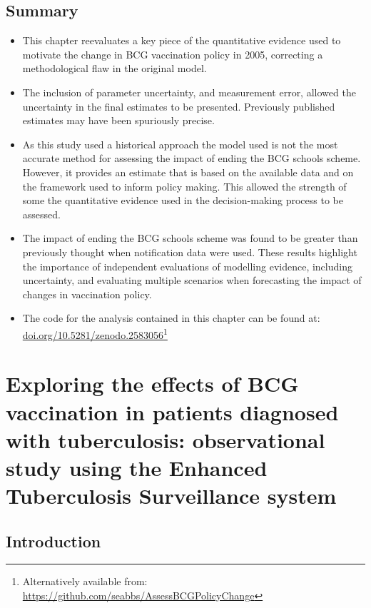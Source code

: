 \documentclass[11pt,twoside]{bristolthesis}
\begin{document}
  \hypertarget{summary-4}{%
  \section{Summary}\label{summary-4}}
  \begin{itemize}
  \item
    This chapter reevaluates a key piece of the quantitative evidence used to motivate the change in BCG vaccination policy in 2005, correcting a methodological flaw in the original model.
  \item
    The inclusion of parameter uncertainty, and measurement error, allowed the uncertainty in the final estimates to be presented. Previously published estimates may have been spuriously precise.
  \item
    As this study used a historical approach the model used is not the most accurate method for assessing the impact of ending the BCG schools scheme. However, it provides an estimate that is based on the available data and on the framework used to inform policy making. This allowed the strength of some the quantitative evidence used in the decision-making process to be assessed.
  \item
    The impact of ending the BCG schools scheme was found to be greater than previously thought when notification data were used. These results highlight the importance of independent evaluations of modelling evidence, including uncertainty, and evaluating multiple scenarios when forecasting the impact of changes in vaccination policy.
  \item
    The code for the analysis contained in this chapter can be found at:
    \href{https://doi.org/10.5281/zenodo.2583056}{doi.org/10.5281/zenodo.2583056}\footnote{Alternatively available from: \url{https://github.com/seabbs/AssessBCGPolicyChange}}
  \end{itemize}
  \hypertarget{beneficial-bcg-out}{%
  \chapter{Exploring the effects of BCG vaccination in patients diagnosed with tuberculosis: observational study using the Enhanced Tuberculosis Surveillance system}\label{beneficial-bcg-out}}
  
  \hypertarget{introduction-4}{%
  \section{Introduction}\label{introduction-4}}
  
\end{document}
